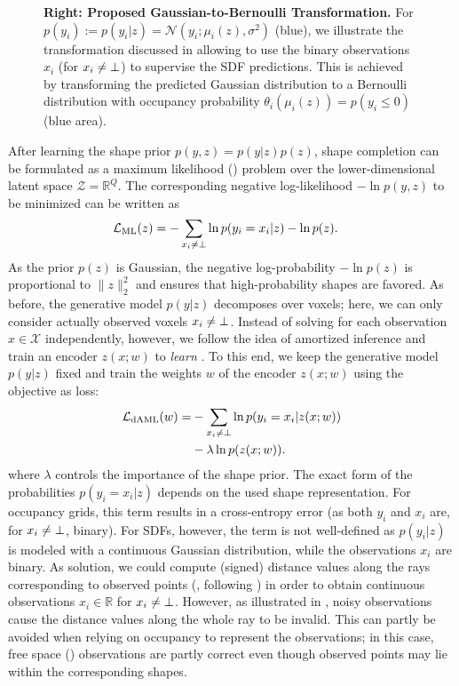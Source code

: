 \begin{figure}[t]
{{            {\bf Right: Proposed Gaussian-to-Bernoulli Transformation.} For $p(y_i) := p(y_i | z) = \mathcal{N}(y_i;\mu_i(z), \sigma^2)$ ({\color{blue}blue}), we illustrate the transformation discussed in  allowing to use the binary observations $x_i$ (for $x_i \neq \bot$) to supervise the SDF predictions. This is achieved by transforming the predicted Gaussian distribution to a Bernoulli distribution with occupancy probability $\theta_i(\mu_i(z)) = p(y_i \leq 0)$ ({\color{blue}blue area}).}}
    \label{fig:method-sdf}
    \vspace*{-\figskipbelow px}
\end{figure}

After learning the shape prior $p(y, z) = p(y| z) p(z)$, shape completion can be formulated as a maximum likelihood (\ML) problem over the lower-dimensional latent space $\mathcal{Z} = \mathbb{R}^Q$. The corresponding negative log-likelihood $-\ln p(y, z)$ to be minimized can be written as
%
\begin{align}
\mathcal{L}_{\text{ML}}(z) &= - \sum_{x_i \neq \bot} \ln p(y_i = x_i | z) - \ln p(z).\label{eq:ml}
\end{align}
%
As the prior $p(z)$ is Gaussian, the negative log-probability $- \ln p(z)$ is proportional to $\|z\|_2^2$ and ensures that high-probability shapes are favored. As before, the generative model $p(y | z)$ decomposes over voxels; here, we can only consider actually observed voxels $x_i \neq \bot$. Instead of solving  for each observation $x \in \mathcal{X}$ independently, however, we follow the idea of amortized inference \citep{Gersham2014COGSCI} and train an encoder $z(x;w)$ to \emph{learn} \ML. To this end, we keep the generative model $p(y|z)$ fixed and train the weights $w$ of the encoder $z(x;w)$ using the \ML objective as loss:
%
\begin{align}
    \begin{split}
        \mathcal{L}_{\text{dAML}}(w) =& - \sum _{x_i \neq \bot} \ln p(y_i = x_i | z(x; w))\\
        &- \lambda \ln p(z(x; w)).\label{eq:aml}
    \end{split}
\end{align}
%
where $\lambda$ controls the importance of the shape prior. The exact form of the probabilities $p(y_i = x_i | z)$ depends on the used shape representation. For occupancy grids, this term results in a cross-entropy error (as both $y_i$ and $x_i$ are, for $x_i \neq \bot$, binary). For SDFs, however, the term is not well-defined as $p(y_i | z)$ is modeled with a continuous Gaussian distribution, while the observations $x_i$ are binary. As solution, we could compute (signed) distance values along the rays corresponding to observed points (\eg, following \citep{Steinbrucker2013ICCV}) in order to obtain continuous observations $x_i \in\mathbb{R}$ for $x_i \neq \bot$. However, as illustrated in , noisy observations cause the distance values along the whole ray to be invalid. This can partly be avoided when relying on occupancy to represent the observations; in this case, free space (\cf {}) observations are partly correct even though observed points may lie within the corresponding shapes.

